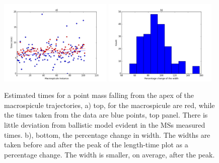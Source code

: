 \begin{figure}[h!]
	\centering
	\includegraphics[width=0.48\textwidth]{Chapter3/Figs/times_falling.pdf}
	\includegraphics[width=0.48\textwidth]{Chapter3/Figs/width_percent.pdf}
	
	\caption{\small Estimated times for a point mass falling from the apex of the macrospicule trajectories, a) top, for the macrospicule are red, while the times taken from the data are blue points, top panel. There is little deviation from ballistic model evident in the MSs measured times. b), bottom, the percentage change in width. The widths are taken before and after the peak of the length-time plot as a percentage change. The width is smaller, on average, after the peak.}
	\label{fig:ballistics}
\end{figure}

